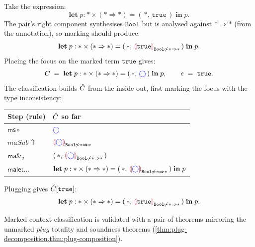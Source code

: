 Take the expression:
\[
  \mathbf{let}\;p : * \times (* \Rightarrow *) = (\,*,\,\texttt{true}\,)\;\mathbf{in}\;p.
\]
The pair's right component synthesises $\texttt{Bool}$ but is
analysed against $* \Rightarrow *$ (from the annotation), so marking should produce:
\[
  \mathbf{let}\;p : * \times (* \Rightarrow *) = (\,*,\,\markincon[\texttt{true}]{\texttt{Bool}}{* \Rightarrow *}\,)\;\mathbf{in}\;p.
\]
Placing the focus on the marked term $\texttt{true}$ gives:
\[
  C \;=\; \mathbf{let}\;p : * \times (* \Rightarrow *) = (\,*,\,{\color{blue}\bigcirc}\,)\;\mathbf{in}\;p,
  \qquad
  e \;=\; \texttt{true}.
\]
The classification builds $\check{C}$ from the inside out, first marking the focus with the type inconsistency:
\begin{center}
\small
\begin{tabular}{ll}
\toprule
\textbf{Step (rule)} & \textbf{$\check{C}$ so far} \\
\midrule
$\mathsf{ms}\circ$              & ${\color{blue}\bigcirc}$ \\
$maSub\!\Uparrow$               & $\markincon[\cmark]{\texttt{Bool}}{* \Rightarrow *}$ \\
$\mathsf{ma}\&_2$               & $(\,*,\,\markincon[\cmark]{\texttt{Bool}}{* \Rightarrow *}\,)$ \\
$\mathsf{ma}\textsf{let}\ldots$ & $\mathbf{let}\;p : * \times (* \Rightarrow *) = (\,*,\,\markincon[\cmark]{\texttt{Bool}}{* \Rightarrow *}\,)\;\mathbf{in}\;p$ \\
\bottomrule
\end{tabular}
\end{center}
Plugging gives $\check{C}[\texttt{true}]$:
\[
  \mathbf{let}\;p : * \times (* \Rightarrow *) = (\,*,\,\markincon[\texttt{true}]{\texttt{Bool}}{* \Rightarrow *}\,)\;\mathbf{in}\;p.
\]

Marked context classification is validated with a pair of theorems mirroring the unmarked
$\mathit{plug}$ totality and soundness theorems
(\cref{thm:plug-decomposition,thm:plug-composition}).

